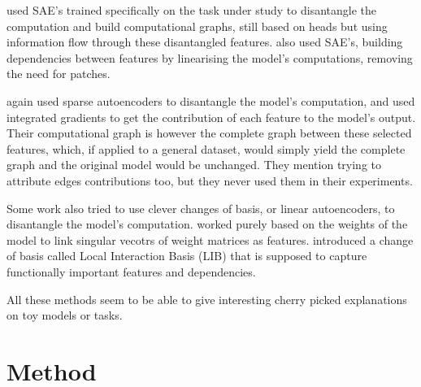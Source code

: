 \documentclass{article}
\begin{document}

\citet{oneill2024sparse} used SAE's trained specifically on the task under study to disantangle the computation and build computational graphs, still based on heads but using information flow through these disantangled features. \citet{he2024dictionaryCircuits} also used SAE's, building dependencies between features by linearising the model's computations, removing the need for patches.%

\citet{marks2024sparseCircuits} again used sparse autoencoders to disantangle the model's computation, and used integrated gradients to get the contribution of each feature to the model's output. Their computational graph is however the complete graph between these selected features, which, if applied to a general dataset, would simply yield the complete graph and the original model would be unchanged. They mention trying to attribute edges contributions too, but they never used them in their experiments.

Some work also tried to use clever changes of basis, or linear autoencoders, to disantangle the model's computation. \citet{merullo2024talking} worked purely based on the weights of the model to link singular vecotrs of weight matrices as features. \citet{bushnaq2024using} introduced a change of basis called Local Interaction Basis (LIB) that is supposed to capture functionally important features and dependencies.

All these methods seem to be able to give interesting cherry picked explanations on toy models or tasks.

\section{Method}
\end{document}
